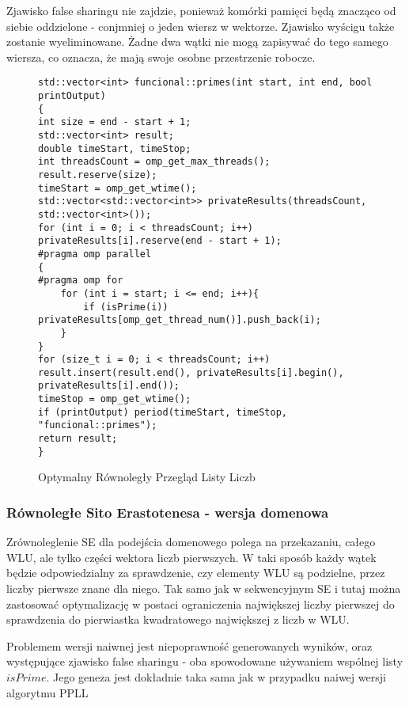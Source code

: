 \documentclass{article}
\begin{document}
                    Zjawisko false sharingu nie zajdzie, ponieważ komórki pamięci będą znacząco od siebie oddzielone - conjmniej o jeden wiersz w wektorze. Zjawisko wyścigu także zostanie wyeliminowane. Żadne dwa wątki nie mogą zapisywać do tego samego wiersza, co oznacza, że mają swoje osobne przestrzenie robocze.
                \begin{figure}[H]
                    \begin{verbatim}
std::vector<int> funcional::primes(int start, int end, bool printOutput)
{
int size = end - start + 1;
std::vector<int> result;
double timeStart, timeStop;
int threadsCount = omp_get_max_threads();
result.reserve(size);
timeStart = omp_get_wtime();
std::vector<std::vector<int>> privateResults(threadsCount, std::vector<int>());
for (int i = 0; i < threadsCount; i++) privateResults[i].reserve(end - start + 1);
#pragma omp parallel
{
#pragma omp for
    for (int i = start; i <= end; i++){
        if (isPrime(i)) privateResults[omp_get_thread_num()].push_back(i);
    }
}
for (size_t i = 0; i < threadsCount; i++) result.insert(result.end(), privateResults[i].begin(), privateResults[i].end());
timeStop = omp_get_wtime();
if (printOutput) period(timeStart, timeStop, "funcional::primes");
return result;
}
                    \end{verbatim}
                    \caption{Optymalny Równoległy Przegląd Listy Liczb}
                \end{figure}
                
                
            \subsubsection{Równoległe Sito Erastotenesa - wersja domenowa}
                Zrównoleglenie \gls{SE} dla podejścia domenowego polega na przekazaniu, całego \gls{WLU}, ale tylko części wektora liczb pierwszych. W taki sposób każdy wątek będzie odpowiedzialny za sprawdzenie, czy elementy \gls{WLU} są podzielne, przez liczby pierwsze znane dla niego. Tak samo jak w sekwencyjnym \gls{SE} i tutaj można zastosować optymalizację w postaci ograniczenia największej liczby pierwszej do sprawdzenia do pierwiastka kwadratowego największej z liczb w \gls{WLU}.
                
                Problemem wersji naiwnej jest niepoprawność generowanych wyników, oraz występujące zjawisko false sharingu - oba spowodowane używaniem wspólnej listy $isPrime$. Jego geneza jest dokładnie taka sama jak w przypadku naiwej wersji algorytmu \gls{PPLL}
                
\end{document}
